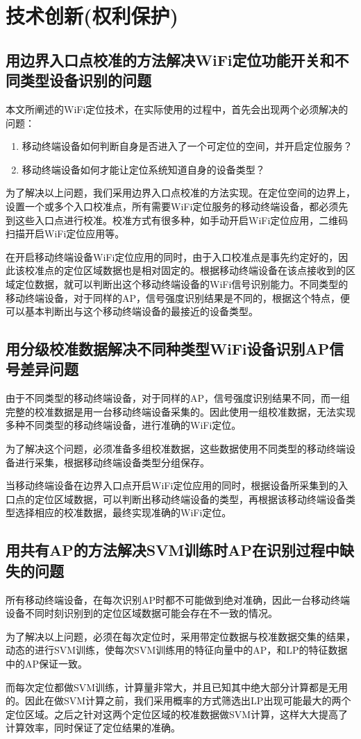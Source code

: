 \documentclass[UTF8, twocolumn ]{ctexart}
\begin{document}
\section{技术创新(权利保护)}
\subsection{用边界入口点校准的方法解决WiFi定位功能开关和不同类型设备识别的问题}
本文所阐述的WiFi定位技术，在实际使用的过程中，首先会出现两个必须解决的问题：
\begin{enumerate}
\item 移动终端设备如何判断自身是否进入了一个可定位的空间，并开启定位服务？
\item 移动终端设备如何才能让定位系统知道自身的设备类型？
\end{enumerate}
\par
为了解决以上问题，我们采用边界入口点校准的方法实现。在定位空间的边界上，设置一个或多个入口校准点，所有需要WiFi定位服务的移动终端设备，都必须先到这些入口点进行校准。校准方式有很多种，如手动开启WiFi定位应用，二维码扫描开启WiFi定位应用等。
\par
在开启移动终端设备WiFi定位应用的同时，由于入口校准点是事先约定好的，因此该校准点的定位区域数据也是相对固定的。根据移动终端设备在该点接收到的区域定位数据，就可以判断出这个移动终端设备的WiFi信号识别能力。不同类型的移动终端设备，对于同样的AP，信号强度识别结果是不同的，根据这个特点，便可以基本判断出与这个移动终端设备的最接近的设备类型。

\subsection{用分级校准数据解决不同种类型WiFi设备识别AP信号差异问题}
由于不同类型的移动终端设备，对于同样的AP，信号强度识别结果不同，而一组完整的校准数据是用一台移动终端设备采集的。因此使用一组校准数据，无法实现多种不同类型的移动终端设备，进行准确的WiFi定位。
\par
为了解决这个问题，必须准备多组校准数据，这些数据使用不同类型的移动终端设备进行采集，根据移动终端设备类型分组保存。
\par
当移动终端设备在边界入口点开启WiFi定位应用的同时，根据设备所采集到的入口点的定位区域数据，可以判断出移动终端设备的类型，再根据该移动终端设备类型选择相应的校准数据，最终实现准确的WiFi定位。

\subsection{用共有AP的方法解决SVM训练时AP在识别过程中缺失的问题}
所有移动终端设备，在每次识别AP时都不可能做到绝对准确，因此一台移动终端设备不同时刻识别到的定位区域数据可能会存在不一致的情况。
\par
为了解决以上问题，必须在每次定位时，采用带定位数据与校准数据交集的结果，动态的进行SVM训练，使每次SVM训练用的特征向量中的AP，和LP的特征数据中的AP保证一致。
\par
而每次定位都做SVM训练，计算量非常大，并且已知其中绝大部分计算都是无用的。因此在做SVM计算之前，我们采用概率的方式筛选出LP出现可能最大的两个定位区域。之后之针对这两个定位区域的校准数据做SVM计算，这样大大提高了计算效率，同时保证了定位结果的准确。
\end{document}
